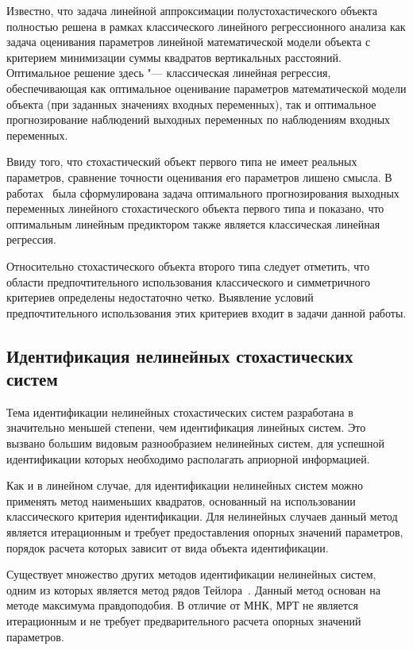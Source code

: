 Известно, что задача линейной аппроксимации полустохастического объекта полностью решена в
рамках классического линейного регрессионного анализа как задача оценивания параметров
линейной математической модели объекта с критерием минимизации суммы квадратов вертикальных расстояний.
Оптимальное решение здесь "--- классическая линейная регрессия,
обеспечивающая как оптимальное оценивание параметров математической модели объекта
(при заданных значениях входных переменных),
так и оптимальное прогнозирование наблюдений выходных переменных по наблюдениям входных переменных.

Ввиду того, что стохастический объект первого типа не имеет реальных параметров,
сравнение точности оценивания его параметров лишено смысла.
В работах~\cite{mukha_2010, mukha_2011} была сформулирована задача оптимального прогнозирования
выходных переменных линейного стохастического объекта первого типа и показано,
что оптимальным линейным предиктором также является классическая линейная регрессия.

Относительно стохастического объекта второго типа следует отметить,
что области предпочтительного использования классического и симметричного критериев
определены недостаточно четко.
Выявление условий предпочтительного использования этих критериев входит в задачи данной работы.

\vspace{2\baselineskip}
\subsection{Идентификация нелинейных стохастических систем}

Тема идентификации нелинейных стохастических систем разработана в
значительно меньшей степени, чем идентификация линейных систем.
Это вызвано большим видовым разнообразием нелинейных систем,
для успешной идентификации которых необходимо располагать априорной информацией.

Как и в линейном случае, для идентификации нелинейных систем можно применять
метод наименьших квадратов, основанный на использовании классического критерия идентификации.
Для нелинейных случаев данный метод является итерационным и
требует предоставления опорных значений параметров,
порядок расчета которых зависит от вида объекта идентификации.

Существует множество других методов идентификации нелинейных систем,
одним из которых является метод рядов Тейлора~\cite{mukha_2000}.
Данный метод основан на методе максимума правдоподобия.
В отличие от МНК, МРТ не является итерационным и не требует предварительного расчета
опорных значений параметров.


